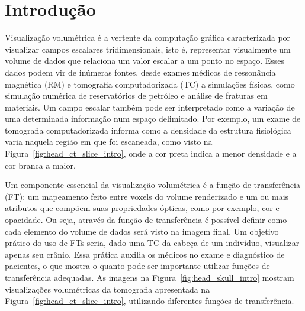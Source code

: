 
\chapter{Introdução}
\label{ch:intro}
	Visualização volumétrica é a vertente da computação gráfica caracterizada por visualizar campos escalares tridimensionais, isto é, representar visualmente um volume de dados que relaciona um valor escalar a um ponto no espaço. Esses dados podem vir de inúmeras fontes, desde exames médicos de ressonância magnética (RM) e tomografia computadorizada (TC) a simulações físicas, como simulação numérica de reservatórios de petróleo e análise de fraturas em materiais. Um campo escalar também pode ser interpretado como a variação de uma determinada informação num espaço delimitado. Por exemplo, um exame de tomografia computadorizada informa como a densidade da estrutura fisiológica varia naquela região em que foi escaneada, como visto na Figura~\ref{fig:head_ct_slice_intro}, onde a cor preta indica a menor densidade e a cor branca a maior.
    
    Um componente essencial da visualização volumétrica é a função de transferência (FT): um mapeamento feito entre voxels do volume renderizado e um ou mais atributos que compõem suas propriedades ópticas, como por exemplo, cor e opacidade. Ou seja, através da função de transferência é possível definir como cada elemento do volume de dados será visto na imagem final. Um objetivo prático do uso de FTs seria, dado uma TC da cabeça de um indivíduo, visualizar apenas seu crânio. Essa prática auxilia os médicos no exame e diagnóstico de pacientes, o que mostra o quanto pode ser importante utilizar funções de transferência adequadas. As imagens na Figura~\ref{fig:head_skull_intro} mostram visualizações volumétricas da tomografia apresentada na Figura~\ref{fig:head_ct_slice_intro}, utilizando diferentes funções de transferência.
    
